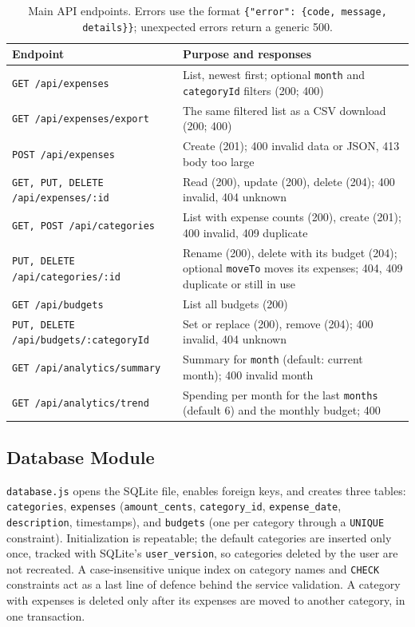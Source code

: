 \documentclass[11pt,a4paper]{article}
\begin{document}
\begin{table}[htbp]
\centering
\small
\begin{tabularx}{\textwidth}{@{}lX@{}}
\toprule
\textbf{Endpoint} & \textbf{Purpose and responses} \\
\midrule
\texttt{GET /api/expenses} & List, newest first; optional \texttt{month} and \texttt{categoryId} filters (200; 400) \\
\texttt{GET /api/expenses/export} & The same filtered list as a CSV download (200; 400) \\
\texttt{POST /api/expenses} & Create (201); 400 invalid data or JSON, 413 body too large \\
\texttt{GET, PUT, DELETE /api/expenses/:id} & Read (200), update (200), delete (204); 400 invalid, 404 unknown \\
\texttt{GET, POST /api/categories} & List with expense counts (200), create (201); 400 invalid, 409 duplicate \\
\texttt{PUT, DELETE /api/categories/:id} & Rename (200), delete with its budget (204); optional \texttt{moveTo} moves its expenses; 404, 409 duplicate or still in use \\
\texttt{GET /api/budgets} & List all budgets (200) \\
\texttt{PUT, DELETE /api/budgets/:categoryId} & Set or replace (200), remove (204); 400 invalid, 404 unknown \\
\texttt{GET /api/analytics/summary} & Summary for \texttt{month} (default: current month); 400 invalid month \\
\texttt{GET /api/analytics/trend} & Spending per month for the last \texttt{months} (default 6) and the monthly budget; 400 \\
\bottomrule
\end{tabularx}
\caption{Main API endpoints. Errors use the format \texttt{\{"error": \{code, message, details\}\}}; unexpected errors return a generic 500.}
\label{tab:api}
\end{table}

\subsection{Database Module}

\texttt{database.js} opens the SQLite file, enables foreign keys, and
creates three tables: \texttt{categories}, \texttt{expenses}
(\texttt{amount\_cents}, \texttt{category\_id}, \texttt{expense\_date},
\texttt{description}, timestamps), and \texttt{budgets} (one per
category through a \texttt{UNIQUE} constraint). Initialization is
repeatable; the default categories are inserted only once, tracked with
SQLite's \texttt{user\_version}, so categories deleted by the user are
not recreated. A case-insensitive unique index on category names and
\texttt{CHECK} constraints act as a last line of defence behind the
service validation. A category with expenses is deleted only after its
expenses are moved to another category, in one transaction.
\end{document}
